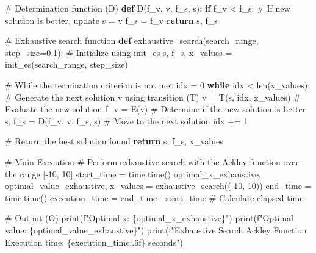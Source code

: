 \documentclass[
  letterpaper,
  DIV=11,
  numbers=noendperiod]{scrreprt}
\newenvironment{Shaded}{\begin{snugshade}}{\end{snugshade}}
\newcommand{\BuiltInTok}[1]{\textcolor[rgb]{0.00,0.23,0.31}{#1}}
\newcommand{\CommentTok}[1]{\textcolor[rgb]{0.37,0.37,0.37}{#1}}
\newcommand{\ControlFlowTok}[1]{\textcolor[rgb]{0.00,0.23,0.31}{\textbf{#1}}}
\newcommand{\DecValTok}[1]{\textcolor[rgb]{0.68,0.00,0.00}{#1}}
\newcommand{\FloatTok}[1]{\textcolor[rgb]{0.68,0.00,0.00}{#1}}
\newcommand{\KeywordTok}[1]{\textcolor[rgb]{0.00,0.23,0.31}{\textbf{#1}}}
\newcommand{\NormalTok}[1]{\textcolor[rgb]{0.00,0.23,0.31}{#1}}
\newcommand{\OperatorTok}[1]{\textcolor[rgb]{0.37,0.37,0.37}{#1}}
\newcommand{\SpecialCharTok}[1]{\textcolor[rgb]{0.37,0.37,0.37}{#1}}
\newcommand{\SpecialStringTok}[1]{\textcolor[rgb]{0.13,0.47,0.30}{#1}}
\begin{document}
\begin{Shaded}
\begin{Highlighting}[]
\CommentTok{\# Determination function (D)}
\KeywordTok{def}\NormalTok{ D(f\_v, v, f\_s, s):}
    \ControlFlowTok{if}\NormalTok{ f\_v }\OperatorTok{\textless{}}\NormalTok{ f\_s:  }\CommentTok{\# If new solution is better, update}
\NormalTok{        s }\OperatorTok{=}\NormalTok{ v}
\NormalTok{        f\_s }\OperatorTok{=}\NormalTok{ f\_v}
    \ControlFlowTok{return}\NormalTok{ s, f\_s}

\CommentTok{\# Exhaustive search function}
\KeywordTok{def}\NormalTok{ exhaustive\_search(search\_range, step\_size}\OperatorTok{=}\FloatTok{0.1}\NormalTok{):}
    \CommentTok{\# Initialize using init\_es}
\NormalTok{    s, f\_s, x\_values }\OperatorTok{=}\NormalTok{ init\_es(search\_range, step\_size)}
    
    \CommentTok{\# While the termination criterion is not met}
\NormalTok{    idx }\OperatorTok{=} \DecValTok{0}
    \ControlFlowTok{while}\NormalTok{ idx }\OperatorTok{\textless{}} \BuiltInTok{len}\NormalTok{(x\_values):}
        \CommentTok{\# Generate the next solution v using transition (T)}
\NormalTok{        v }\OperatorTok{=}\NormalTok{ T(s, idx, x\_values)   }
        \CommentTok{\# Evaluate the new solution}
\NormalTok{        f\_v }\OperatorTok{=}\NormalTok{ E(v)  }
        \CommentTok{\# Determine if the new solution is better}
\NormalTok{        s, f\_s }\OperatorTok{=}\NormalTok{ D(f\_v, v, f\_s, s)}
        \CommentTok{\# Move to the next solution}
\NormalTok{        idx }\OperatorTok{+=} \DecValTok{1}
    
    \CommentTok{\# Return the best solution found}
    \ControlFlowTok{return}\NormalTok{ s, f\_s, x\_values}

\CommentTok{\# Main Execution}
\CommentTok{\# Perform exhaustive search with the Ackley function over the range [{-}10, 10]}
\NormalTok{start\_time }\OperatorTok{=}\NormalTok{ time.time()}
\NormalTok{optimal\_x\_exhaustive, optimal\_value\_exhaustive, x\_values }\OperatorTok{=}\NormalTok{ exhaustive\_search((}\OperatorTok{{-}}\DecValTok{10}\NormalTok{, }\DecValTok{10}\NormalTok{))}
\NormalTok{end\_time }\OperatorTok{=}\NormalTok{ time.time()}
\NormalTok{execution\_time }\OperatorTok{=}\NormalTok{ end\_time }\OperatorTok{{-}}\NormalTok{ start\_time  }\CommentTok{\# Calculate elapsed time}

\CommentTok{\# Output (O)}
\BuiltInTok{print}\NormalTok{(}\SpecialStringTok{f"Optimal x: }\SpecialCharTok{\{}\NormalTok{optimal\_x\_exhaustive}\SpecialCharTok{\}}\SpecialStringTok{"}\NormalTok{)}
\BuiltInTok{print}\NormalTok{(}\SpecialStringTok{f"Optimal value: }\SpecialCharTok{\{}\NormalTok{optimal\_value\_exhaustive}\SpecialCharTok{\}}\SpecialStringTok{"}\NormalTok{)}
\BuiltInTok{print}\NormalTok{(}\SpecialStringTok{f"Exhaustive Search Ackley Function Execution time: }\SpecialCharTok{\{}\NormalTok{execution\_time}\SpecialCharTok{:.6f\}}\SpecialStringTok{ seconds"}\NormalTok{)}


\end{Highlighting}
\end{Shaded}
\end{document}

